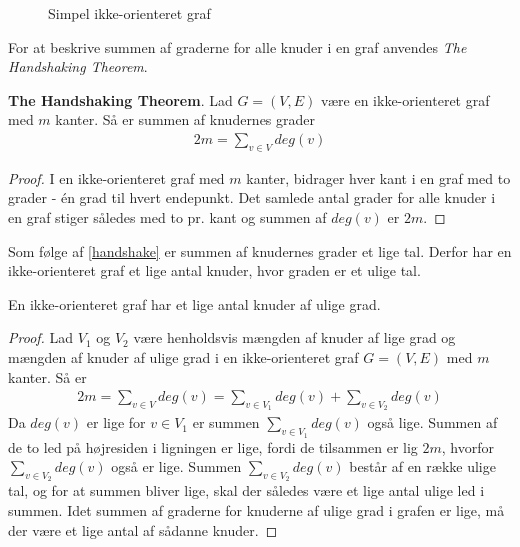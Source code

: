 \begin{figure}[h]
\centering
{}
\caption{Simpel ikke-orienteret graf} \label{eksempel_nabo}
\end{figure}

For at beskrive summen af graderne for alle knuder i en graf anvendes \textit{The Handshaking Theorem}. 

\begin{thm}\label{handshake}
\textbf{The Handshaking Theorem}. Lad $G=(V,E)$ være en ikke-orienteret graf med $m$ kanter. Så er summen af knudernes grader \\
\begin{align*}
2m=\sum_{v \in V}deg(v)
\end{align*}
\end{thm}

\begin{proof}
I en ikke-orienteret graf med $m$ kanter, bidrager hver kant i en graf med to grader - én grad til hvert endepunkt. Det samlede antal grader for alle knuder i en graf stiger således med to pr. kant og summen af $deg(v)$ er $2m$. 
\end{proof}

Som følge af \ref{handshake} er summen af knudernes grader et lige tal. Derfor har en ikke-orienteret graf et lige antal knuder, hvor graden er et ulige tal.

\begin{thm}
En ikke-orienteret graf har et lige antal knuder af ulige grad. 
\end{thm}

\begin{proof}
Lad $V_1$ og $V_2$ være henholdsvis mængden af knuder af lige grad og mængden af knuder af ulige grad i en ikke-orienteret graf $G=(V,E)$ med $m$ kanter. Så er \\
\begin{align*}
2m=\sum_{v \in V}deg(v)=\sum_{v \in V_1}deg(v)+ \sum_{v \in V_2}deg(v)
\end{align*}
Da $deg(v)$ er lige for $v \in V_1$ er summen $\sum_{v \in V_1}deg(v)$ også lige. Summen af de to led på højresiden i ligningen er lige, fordi de tilsammen er lig $2m$, hvorfor $\sum_{v \in V_2}deg(v)$ også er lige. Summen $\sum_{v \in V_2}deg(v)$ består af en række ulige tal, og for at summen bliver lige, skal der således være et lige antal ulige led i summen.
Idet summen af graderne for knuderne af ulige grad i grafen er lige, må der være et lige antal af sådanne knuder.
\end{proof}










